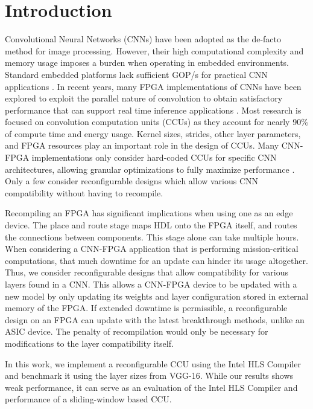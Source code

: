 \chapter {Introduction}
 
Convolutional Neural Networks (CNNs) have been adopted as the de-facto method for image processing. However, their high computational complexity and memory usage imposes a burden when operating in embedded environments. Standard embedded platforms lack sufficient GOP/s for practical CNN applications \cite{guo2018angel}. In recent years, many FPGA implementations of CNNs have been explored to exploit the parallel nature of convolution to obtain satisfactory performance that can support real time inference applications \cite{toledo2012fpga}. Most research is focused on convolution computation units (CCUs) as they account for nearly 90\% of compute time and energy usage. Kernel sizes, strides, other layer parameters, and FPGA resources play an important role in the design of CCUs. Many CNN-FPGA implementations only consider hard-coded CCUs for specific CNN architectures, allowing granular optimizations to fully maximize performance \cite{liu2016automatic, toledo2012fpga, hwang2017efficient, bettoni2017convolutional, jiao2017accelerating}. Only a few consider reconfigurable designs which allow various CNN compatibility without having to recompile\cite{tu2017deep, dicecco2016caffeinated, lu2017evaluating}.

Recompiling an FPGA has significant implications when using one as an edge device. The place and route stage maps HDL onto the FPGA itself, and routes the connections between components. This stage alone can take multiple hours. When considering a CNN-FPGA application that is performing mission-critical computations, that much downtime for an update can hinder its usage altogether. Thus, we consider reconfigurable designs that allow compatibility for various layers found in a CNN. This allows a CNN-FPGA device to be updated with a new model by only updating its weights and layer configuration stored in external memory of the FPGA. If extended downtime is permissible, a reconfigurable design on an FPGA can update with the latest breakthrough methods, unlike an ASIC device. The penalty of recompilation would only be necessary for modifications to the layer compatibility itself.

In this work, we implement a reconfigurable CCU using the Intel HLS Compiler and benchmark it using the layer sizes from VGG-16. While our results shows weak performance, it can serve as an evaluation of the Intel HLS Compiler and performance of a sliding-window based CCU.

